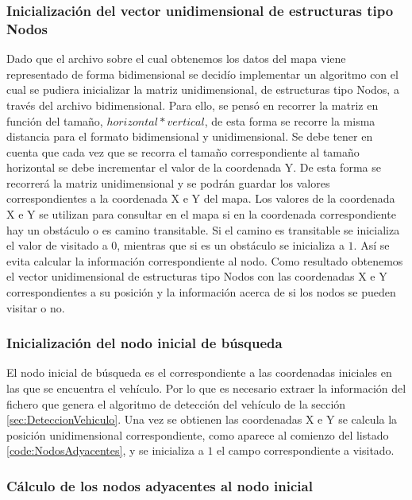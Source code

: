 \subsubsection{Inicialización del vector unidimensional de estructuras tipo Nodos}\label{subsec:InitNodes}

Dado que el archivo sobre el cual obtenemos los datos del mapa viene representado de forma bidimensional se decidío implementar un algoritmo con el cual se pudiera inicializar la matriz unidimensional, de estructuras tipo Nodos, a través del archivo bidimensional. Para ello, se pensó en recorrer la matriz en función del tamaño, $horizontal*vertical$, de esta forma se recorre la misma distancia para el formato bidimensional y unidimensional. Se debe tener en cuenta que cada vez que se recorra el tamaño correspondiente al tamaño horizontal se debe incrementar el valor de la coordenada Y. De esta forma se recorrerá la matriz unidimensional y se podrán guardar los valores correspondientes a la coordenada X e Y del mapa. Los valores de la coordenada X e Y se utilizan para consultar en el mapa si en la coordenada correspondiente hay un obstáculo o es camino transitable. Si el camino es transitable se inicializa el valor de visitado a $0$, mientras que si es un obstáculo se inicializa a $1$. Así se evita calcular la información correspondiente al nodo. Como resultado obtenemos el vector unidimensional de estructuras tipo Nodos con las coordenadas X e Y correspondientes a su posición y la información acerca de si los nodos se pueden visitar o no.

\subsubsection{Inicialización del nodo inicial de búsqueda}\label{subsec:InitStart}

El nodo inicial de búsqueda es el correspondiente a las coordenadas iniciales en las que se encuentra el vehículo. Por lo que es necesario extraer la información del fichero que genera el algoritmo de detección del vehículo de la sección \ref{sec:DeteccionVehiculo}. Una vez se obtienen las coordenadas X e Y se calcula la posición unidimensional correspondiente, como aparece al comienzo del listado \ref{code:NodosAdyacentes}, y se inicializa a $1$ el campo correspondiente a visitado.

\subsubsection{Cálculo de los nodos adyacentes al nodo inicial}\label{subsec:NodosAdyacentesStart}

